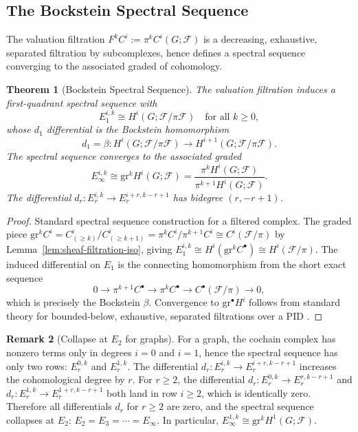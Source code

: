 \documentclass[11pt]{amsart}
\theoremstyle{plain}
\newtheorem{theorem}{Theorem}[section]
\theoremstyle{definition}
\newtheorem{remark}[theorem]{Remark}
\newcommand{\unif}{\pi}                        %
\newcommand{\sheaf}[1]{\mathcal{#1}}                  %
\newcommand{\Bock}{\beta}            %
\newcommand{\gr}{\mathrm{gr}}                         %
\begin{document}
\subsection{The Bockstein Spectral Sequence}
\label{ssec:bockstein-ss}

The valuation filtration $F^k C^i := \unif^k C^i(G;\sheaf{F})$ is a decreasing, 
exhaustive, separated filtration by subcomplexes, hence defines a spectral sequence 
converging to the associated graded of cohomology.

\begin{theorem}[Bockstein Spectral Sequence]
\label{thm:bss}
{\cite{McCleary2000}}
The valuation filtration induces a first-quadrant spectral sequence with
\[
E_1^{i,k} \cong H^i(G; \sheaf{F}/\unif\sheaf{F}) \quad \text{for all } k \geq 0,
\]
whose $d_1$ differential is the Bockstein homomorphism
\[
d_1 = \Bock: H^i(G; \sheaf{F}/\unif\sheaf{F}) \longrightarrow 
H^{i+1}(G; \sheaf{F}/\unif\sheaf{F}).
\]
The spectral sequence converges to the associated graded
\[
E_\infty^{i,k} \cong \gr^k H^i(G; \sheaf{F}) = 
\frac{\unif^k H^i(G; \sheaf{F})}{\unif^{k+1} H^i(G; \sheaf{F})}.
\]
The differential $d_r: E_r^{i,k} \to E_r^{i+r,k-r+1}$ has bidegree $(r, -r+1)$.
\end{theorem}

\begin{proof}
Standard spectral sequence construction for a filtered complex. The graded piece 
$\gr^k C^i = C^i_{(\geq k)}/C^i_{(\geq k+1)} = \unif^k C^i/\unif^{k+1} C^i \cong 
C^i(\sheaf{F}/\unif)$ by Lemma~\ref{lem:sheaf-filtration-iso}, giving 
$E_1^{i,k} \cong H^i(\gr^k C^\bullet) \cong H^i(\sheaf{F}/\unif)$. The induced 
differential on $E_1$ is the connecting homomorphism from the short exact sequence
\[
0 \to \unif^{k+1}C^\bullet \to \unif^k C^\bullet \to C^\bullet(\sheaf{F}/\unif) \to 0,
\]
which is precisely the Bockstein $\Bock$. Convergence to $\gr^\bullet H^i$ follows 
from standard theory for bounded-below, exhaustive, separated filtrations over a PID \cite{McCleary2000,Rotman2009}.
\end{proof}

\begin{remark}[Collapse at $E_2$ for graphs]
\label{rem:spectral-sequence-pages}
For a graph, the cochain complex has nonzero terms only in degrees $i=0$ and $i=1$, 
hence the spectral sequence has only two rows: $E_r^{0,k}$ and $E_r^{1,k}$. The 
differential $d_r: E_r^{i,k} \to E_r^{i+r,k-r+1}$ increases the cohomological degree 
by $r$. For $r \ge 2$, the differential $d_r: E_r^{0,k} \to E_r^{r,k-r+1}$ and $d_r: E_r^{1,k} \to E_r^{1+r,k-r+1}$ both land in row $i \ge 2$, which is identically zero. 
Therefore all differentials $d_r$ for $r \ge 2$ are zero, and the 
spectral sequence collapses at $E_2$: $E_2 = E_3 = \cdots = E_\infty$. In particular, 
$E_\infty^{1,k}\cong \gr^k H^1(G;\sheaf{F})$.
\end{remark}
\end{document}
